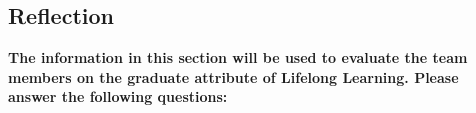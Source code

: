 \documentclass[12pt, titlepage]{article}
\begin{document}



\subsection{Reflection}

\textbf{The information in this section will be used to evaluate the team members on the graduate attribute
	of Lifelong Learning. Please answer the following questions:}
\end{document}
